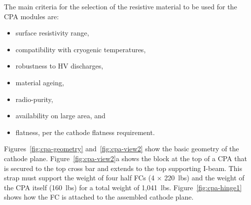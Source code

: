 


The main criteria for the selection of the resistive material to be used for the CPA modules are: 
\begin{itemize}	
\item surface resistivity range,
\item compatibility with cryogenic temperatures,
\item robustness to HV discharges, 
\item material ageing,
\item radio-purity,
\item availability on large area,  and 
\item flatness, per the cathode flatness requirement. 
\end{itemize}




Figures~\ref{fig:cpa-geometry} and~\ref{fig:cpa-view2} show the basic geometry of the cathode plane. Figure~\ref{fig:cpa-view2}a shows the block at the top of a CPA that is secured to the top cross bar and extends to the top supporting I-beam.  This strap  must support the weight of four half FCs (4 $\times$ 220~lbs) and the weight of the CPA itself (160~lbs) for a total weight of 1,041~lbs.  Figure~\ref{fig:cpa-hinge1} shows how the FC is attached to the assembled cathode plane. 

